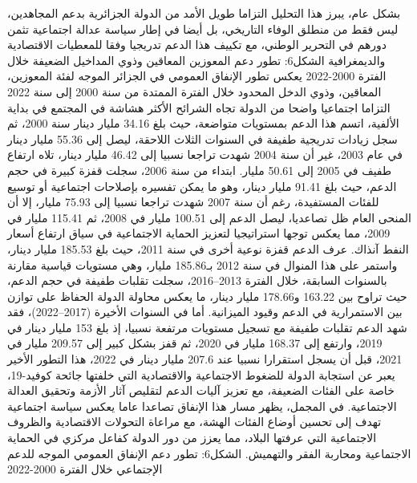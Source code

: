 \documentclass[12pt,a4paper]{report}
\begin{document}
بشكل عام، يبرز هذا التحليل التزاما طويل الأمد من الدولة الجزائرية بدعم المجاهدين، ليس فقط من منطلق الوفاء التاريخي، بل أيضا في إطار سياسة عدالة اجتماعية تثمن دورهم في التحرير الوطني، مع تكييف هذا الدعم تدريجيا وفقا للمعطيات الاقتصادية والديمغرافية
الشكل6: تطور دعم المعوزين المعاقين وذوي المداخيل الضعيفة خلال الفترة 2000-2022
يعكس تطور الإنفاق العمومي في الجزائر الموجه لفئة المعوزين، المعاقين، وذوي الدخل المحدود خلال الفترة الممتدة من سنة 2000 إلى سنة 2022 التزاما اجتماعيا واضحا من الدولة تجاه الشرائح الأكثر هشاشة في المجتمع في بداية الألفية، اتسم هذا الدعم بمستويات متواضعة، حيث بلغ 34.16 مليار دينار سنة 2000، ثم سجل زيادات تدريجية طفيفة في السنوات الثلاث اللاحقة، ليصل إلى 55.36 مليار دينار في عام 2003، غير أن سنة 2004 شهدت تراجعا نسبيا إلى 46.42 مليار دينار، تلاه ارتفاع طفيف في 2005 إلى 50.61 مليار.
ابتداء من سنة 2006، سجلت قفزة كبيرة في حجم الدعم، حيث بلغ 91.41 مليار دينار، وهو ما يمكن تفسيره بإصلاحات اجتماعية أو توسيع للفئات المستفيدة، رغم أن سنة 2007 شهدت تراجعا نسبيا إلى 75.93 مليار، إلا أن المنحى العام ظل تصاعديا، ليصل الدعم إلى 100.51 مليار في 2008، ثم 115.41 مليار في 2009، مما يعكس توجها استراتيجيا لتعزيز الحماية الاجتماعية في سياق ارتفاع أسعار النفط آنذاك.
عرف الدعم قفزة نوعية أخرى في سنة 2011، حيث بلغ 185.53 مليار دينار، واستمر على هذا المنوال في سنة 2012 بـ185.86 مليار، وهي مستويات قياسية مقارنة بالسنوات السابقة، خلال الفترة 2013–2016، سجلت تقلبات طفيفة في حجم الدعم، حيث تراوح بين 163.22 و178.66 مليار دينار، ما يعكس محاولة الدولة الحفاظ على توازن بين الاستمرارية في الدعم وقيود الميزانية.
أما في السنوات الأخيرة (2017–2022)، فقد شهد الدعم تقلبات طفيفة مع تسجيل مستويات مرتفعة نسبيا، إذ بلغ 153 مليار دينار في 2019، وارتفع إلى 168.37 مليار في 2020، ثم قفز بشكل كبير إلى 209.57 مليار في 2021، قبل أن يسجل استقرارا نسبيا عند 207.6 مليار دينار في 2022، هذا التطور الأخير يعبر عن استجابة الدولة للضغوط الاجتماعية والاقتصادية التي خلفتها جائحة كوفيد-19، خاصة على الفئات الضعيفة، مع تعزيز آليات الدعم لتقليص آثار الأزمة وتحقيق العدالة الاجتماعية.
في المجمل، يظهر مسار هذا الإنفاق تصاعدا عاما يعكس سياسة اجتماعية تهدف إلى تحسين أوضاع الفئات الهشة، مع مراعاة التحولات الاقتصادية والظروف الاجتماعية التي عرفتها البلاد، مما يعزز من دور الدولة كفاعل مركزي في الحماية الاجتماعية ومحاربة الفقر والتهميش.
الشكل6: تطور دعم الإنفاق العمومي الموجه للدعم الإجتماعي خلال الفترة 2000-2022
\end{document}
